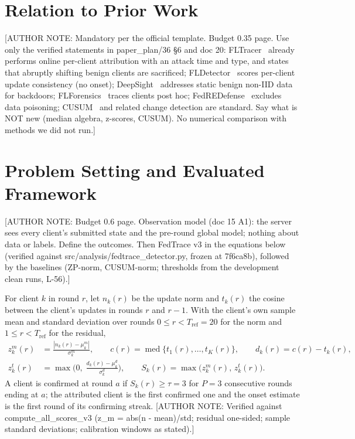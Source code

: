 \documentclass{article}
\newif\ifshownotes \shownotestrue
\newcommand{\authornote}[1]{\ifshownotes{\color{blue}\footnotesize[AUTHOR NOTE: #1]}\fi}
\begin{document}
\section{Relation to Prior Work}
\label{sec:prior}
\authornote{Mandatory per the official template. Budget 0.35 page. Use only the verified statements in
paper\_plan/36 \S6 and doc 20: FLTracer~\cite{zhang2024fltracer} already performs online per-client attribution
with an attack time and type, and states that abruptly shifting benign clients are sacrificed; FLDetector~\cite{zhang2022fldetector}
scores per-client update consistency (no onset); DeepSight~\cite{rieger2022deepsight} addresses static benign
non-IID data for backdoors; FLForensics~\cite{jia2025flforensics} traces clients post hoc; FedREDefense~\cite{xie2024fedredefense}
excludes data poisoning; CUSUM~\cite{page1954cusum} and related change detection are standard. Say what is NOT new
(median algebra, z-scores, CUSUM). No numerical comparison with methods we did not run.}

\section{Problem Setting and Evaluated Framework}
\label{sec:method}
\authornote{Budget 0.6 page. Observation model (doc 15 A1): the server sees every client's submitted state and the
pre-round global model; nothing about data or labels. Define the outcomes. Then FedTrace v3 in the equations below
(verified against src/analysis/fedtrace\_detector.py, frozen at 7f6ca8b), followed by the baselines (ZP-norm,
CUSUM-norm; thresholds from the development clean runs, L-56).}

For client $k$ in round $r$, let $n_k(r)$ be the update norm and $t_k(r)$ the cosine between the client's updates in
rounds $r$ and $r-1$. With the client's own sample mean and standard deviation over rounds $0\le r<T_{\mathrm{ref}}=20$
for the norm and $1\le r<T_{\mathrm{ref}}$ for the residual,
\begin{align}
z^m_k(r) &= \frac{|n_k(r)-\mu^m_k|}{\sigma^m_k}, \qquad
c(r) = \operatorname{med}\{t_1(r),\dots,t_K(r)\}, \qquad d_k(r) = c(r) - t_k(r), \label{eq:scores}\\
z^t_k(r) &= \max\!\Big(0,\; \frac{d_k(r)-\mu^d_k}{\sigma^d_k}\Big), \qquad
S_k(r) = \max\big(z^m_k(r),\, z^t_k(r)\big). \label{eq:score}
\end{align}
A client is confirmed at round $a$ if $S_k(r)\ge\tau=3$ for $P=3$ consecutive rounds ending at $a$; the attributed
client is the first confirmed one and the onset estimate is the first round of its confirming streak.
\authornote{Verified against compute\_all\_scores\_v3 (z\_m = abs(n - mean)/std; residual one-sided; sample
standard deviations; calibration windows as stated).}
\end{document}

